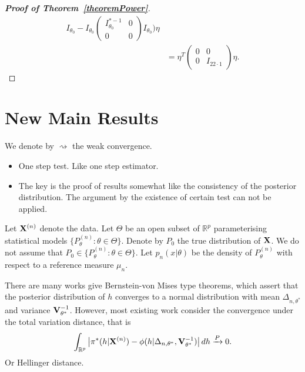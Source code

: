 \documentclass[3p]{elsarticle}
\theoremstyle{plain}
\theoremstyle{definition}
\theoremstyle{remark}
\begin{document}
\begin{proof}[\textbf{Proof of Theorem~\ref{theoremPower}}]
\begin{equation}
\begin{aligned}
        I_{\theta_0}-
        I_{\theta_0}
        \left(\begin{matrix} 
                I^{*-1}_{\theta_0}&0\\
                0&0
        \end{matrix}\right)
        I_{\theta_0}
    )\eta
    \\
    &=\eta^T
    \left(
        \begin{matrix}
            0&0\\
            0&I_{22\cdot 1}
        \end{matrix}
    \right)
    \eta.
    \end{aligned}
\end{equation}
\end{proof}

\section{New Main Results}
We denote by $\rightsquigarrow$ the weak convergence. 


{\color{red}
\begin{itemize}
    \item
One step test. Like one step estimator.
\item
    The key is the proof of results somewhat like the consistency of the posterior distribution. The argument by the existence of certain test can not be applied.
\end{itemize}
}

Let $\mathbf{X}^{(n)}$ denote the data.
Let $\Theta$ be an open subset of $\mathbb{R}^p$ parameterising statistical models $\{P_{\theta}^{(n)}:\theta\in \Theta\}$. 
Denote by $P_0$ the true distribution of $\mathbf{X}$.
We do not assume that $P_0\in  \{P_{\theta}^{(n)}:\theta\in \Theta\}$.
Let $p_{n}(x|\theta)$ be the density of  $P_{\theta}^{(n)}$ with respect to a reference measure $\mu_n$.





There are many works give Bernstein-von Mises type theorems, which assert that the posterior distribution of $h$ converges to a normal distribution with mean $\Delta_{n,\theta^*}$ and variance $\mathbf{V}_{\theta^*}^{-1}$.
However, most existing work consider the convergence under the total variation distance, that is
$$
\int_{\mathbb{R}^p}\big|\pi^*(h|\mathbf{X}^{(n)})-\phi(h|\Delta_{n,\theta^*},\mathbf{V}_{\theta^*}^{-1})\big| \, dh \xrightarrow{P} 0.
$$
Or Hellinger distance.
\end{document}
